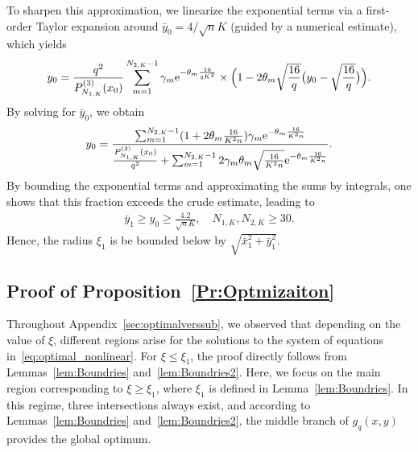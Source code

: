 \documentclass[journal,12pt,onecolumn,draftclsnofoot]{IEEEtran}
\theoremstyle{definition}
\begin{document}
To sharpen this approximation,  we linearize the exponential terms via a first-order Taylor expansion around $\bar{y}_0=4/\sqrt{n}K$ (guided by a numerical estimate), which yields 
\begin{align}
    {y}_0  = \frac{q^2}{P_{N_{1, K}}^{(3)}({x}_0)} \sum_{m=1}^{N_{2, K}-1}\gamma_{m} {\rm e}^{-\theta_{m} \frac{16}{q K^2}}\times \Big(1-2\theta_{m}\sqrt{\frac{16} {q}}\big({y}_0-\sqrt{\frac{16}{q}}\big)\Big).  \nonumber
\end{align}
By solving for $\bar{y}_0$, we obtain 
\begin{align}
    {y}_0 = \frac{\sum_{m=1}^{N_{2, K}-1} (1+2 \theta_m \frac{16}{K^2n})\gamma_m {\rm e}^{-\theta_m \frac{16}{K^2n}}  }{\frac{P_{N_{1, K}}^{(3)}({x}_0)}{q^2} +  \sum_{m=1}^{N_{2, K}-1} 2 \gamma_m \theta_m \sqrt{\frac{16}{K^2n}} {\rm e}^{-\theta_m \frac{16}{K^2n}}}.
\end{align}
By bounding the exponential terms and approximating the sums by integrals, one shows that this fraction exceeds the crude estimate, leading to
\begin{align}
    \bar{y}_1 \geq {y}_0\geq \frac{4.2}{\sqrt{n}K}, \quad N_{1,K}, N_{2,K} \geq 30.  
\end{align}
Hence, the radius $\xi_1$ is be bounded below by $\sqrt{\bar{x}_1^2+\bar{y}_1^2}$.   



\subsection{Proof of Proposition~\ref{Pr:Optmizaiton}}\label{Ap:Optmizaiton}

Throughout Appendix~\ref{sec:optimalverssub}, we observed that depending on the value of $\xi$, different regions arise for the solutions to the system of equations in~\eqref{eq:optimal_nonlinear}. 
For $\xi \leq \xi_1$, the proof directly follows from Lemmas~\ref{lem:Boundries} and~\ref{lem:Boundries2}. 
Here, we focus on the main region corresponding to $\xi \geq \xi_1$, where $\xi_1$ is defined in Lemma~\ref{lem:Boundries}. 
In this regime, three intersections always exist, and according to Lemmas~\ref{lem:Boundries} and~\ref{lem:Boundries2}, the middle branch of $g_q(x,y)$ provides the global optimum. 
\end{document}
